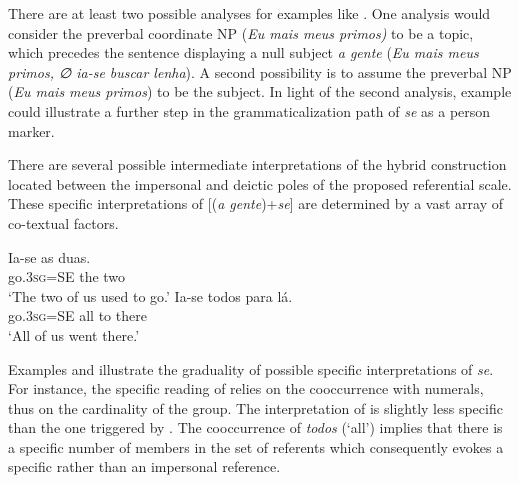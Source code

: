 \documentclass[output=paper]{langscibook}
\begin{document}
There are at least two possible analyses for examples like . One analysis would consider the preverbal coordinate NP (\textit{Eu mais meus primos)} to be a topic, which precedes the sentence displaying a null subject \textit{a gente} (\textit{Eu mais meus primos, {\normalfont∅} ia-se buscar lenha}). A second possibility is to assume the preverbal NP (\textit{Eu mais meus primos}) to be the subject. In light of the second analysis, example  could illustrate a further step in the grammaticalization path of \textit{se} as a  person marker. 

There are several possible intermediate interpretations of the hybrid construction located between the impersonal and deictic poles of the proposed referential scale. These specific interpretations of [(\textit{a gente})+\textit{se}] are determined by a vast array of co-textual factors. 

\ea\label{ex:henriques:22}
 \gll Ia-se as duas.\\
         go.\textsc{3sg}=SE the two\\
 \glt `The two of us used to go.'
\ex\label{ex:henriques:23}
 \gll Ia-se todos para lá.\\
         go.\textsc{3sg}=SE all to there\\
 \glt `All of us went there.'
\z 

Examples  and  illustrate the graduality of possible specific interpretations of \textit{se}. For instance, the specific reading of  relies on the cooccurrence with numerals, thus on the cardinality of the group. The interpretation of  is slightly less specific than the one triggered by . The cooccurrence of \textit{todos} (‘all’) implies that there is a specific number of members in the set of referents which consequently evokes a specific rather than an impersonal reference.
\end{document}
